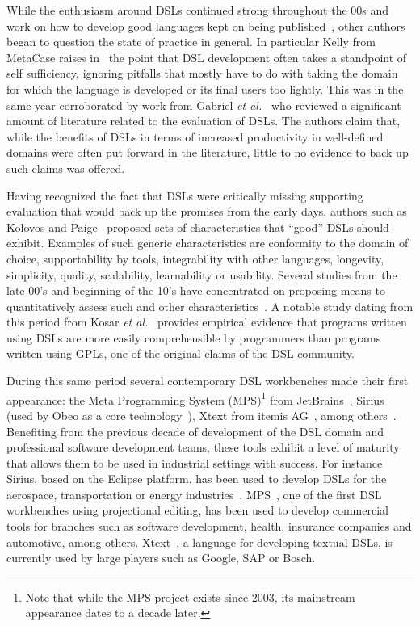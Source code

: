 \documentclass{scrartcl}
\begin{document}
While the enthusiasm around DSLs continued strong throughout the 00s and work on
how to develop good languages kept on being published~\cite{Voelter09}, other
authors began to question the state of practice in general. In particular Kelly
from MetaCase raises in~\cite{Kelly2009} the point that DSL development often
takes a standpoint of self sufficiency, ignoring pitfalls that mostly have to do
with taking the domain for which the language is developed or its final users
too lightly. This was in the same year corroborated by work from Gabriel \emph{et
al.}~\cite{Gabriel09} who reviewed a significant amount of literature related to
the evaluation of DSLs. The authors claim that, while the benefits of DSLs in
terms of increased productivity in well-defined domains were often put forward
in the literature, little to no evidence to back up such claims was offered.

Having recognized the fact that DSLs were critically missing supporting
evaluation that would back up the promises from the early days, authors such as
Kolovos and Paige~\cite{Kolovos06} proposed sets of characteristics that
``good'' DSLs should exhibit. Examples of such generic characteristics are
conformity to the domain of choice, supportability by tools, integrability with
other languages, longevity, simplicity, quality, scalability, learnability or
usability.
Several studies from the late 00's and beginning of the 10's have concentrated
on proposing means to quantitatively assess such and other
characteristics~\cite{KellyTolvanen09,Hermans09,Barisic:12,Kahraman2015}. A
notable study dating from this period from Kosar \emph{et al.}~\cite{Kosar2012}
provides empirical evidence that programs written using DSLs are more easily
comprehensible by programmers than programs written using GPLs, one of the
original claims of the DSL community.

During this same period several contemporary DSL workbenches made their first
appearance: the Meta Programming System (MPS)\footnote{Note that while the MPS
project exists since 2003, its mainstream appearance dates to a decade later.}
from JetBrains~\cite{mps}, Sirius (used by Obeo as a core
technology~\cite{sirius}), Xtext from itemis AG~\cite{xtext}, among
others~\cite{Kelly:2013}. Benefiting from the previous decade of development of
the DSL domain and professional software development teams, these tools exhibit
a level of maturity that allows them to be used in industrial settings with
success. For instance Sirius, based on the Eclipse platform, has been used to
develop DSLs for the aerospace, transportation or energy industries~\cite{obeo}.
MPS~\cite{mps}, one of the first DSL workbenches using projectional editing, has
been used to develop commercial tools for branches such as software development,
health, insurance companies and automotive, among others.
Xtext~\cite{xtext}, a language for developing textual DSLs, is currently used by
large players such as Google, SAP or Bosch.
\end{document}
